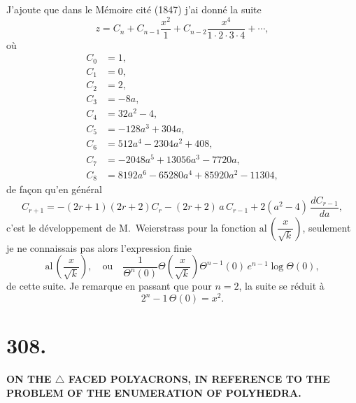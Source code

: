 \documentclass[11pt,a4paper]{article}
\begin{document}
\noindent J'ajoute que dans le M\'{e}moire cit\'{e} (1847) j'ai donn\'{e} la suite
\[
z=C_n+C_{n-1}\frac{x^2}{1}+C_{n-2}\frac{x^4}{1\cdot 2\cdot 3\cdot 4}+\cdots,
\]
o\`{u}
\begin{align*}
C_0 &= 1, \\
C_1 &= 0, \\
C_2 &= 2, \\
C_3 &= -8a, \\
C_4 &= 32a^2-4, \\
C_5 &= -128a^3+304a, \\
C_6 &= 512a^4-2304a^2+408, \\
C_7 &= -2048a^5+13056a^3-7720a, \\
C_8 &= 8192a^6-65280a^4+85920a^2-11304,
\end{align*}
de fa\c{c}on qu'en g\'{e}n\'{e}ral
\[
C_{r+1}=-(2r+1)(2r+2)C_r-(2r+2)\,a\,C_{r-1}+2(a^2-4)\,\frac{dC_{r-1}}{da},
\]
c'est le d\'{e}veloppement de M.~Weierstrass pour la fonction $\mathrm{al}\,\left(\dfrac{x}{\sqrt{k}}\right)$, seulement je ne connaissais pas alors l'expression finie
\[
\mathrm{al}\,\left(\frac{x}{\sqrt{k}}\right), \quad \text{ou}\quad \frac{1}{\Theta^n(0)}\Theta\left(\frac{x}{\sqrt{k}}\right)\Theta^{n-1}(0)\,e^{n-1}\log\Theta(0),
\]
de cette suite. Je remarque en passant que pour $n=2$, la suite se r\'{e}duit \`{a}
\[
2^n-1\,\Theta(0)=x^2.
\]
\clearpage

\section*{308.}

\begin{center}
\textbf{ON THE $\triangle$ FACED POLYACRONS, IN REFERENCE TO THE\\
PROBLEM OF THE ENUMERATION OF POLYHEDRA.}
\end{center}

\bigskip


\bigskip
\end{document}
